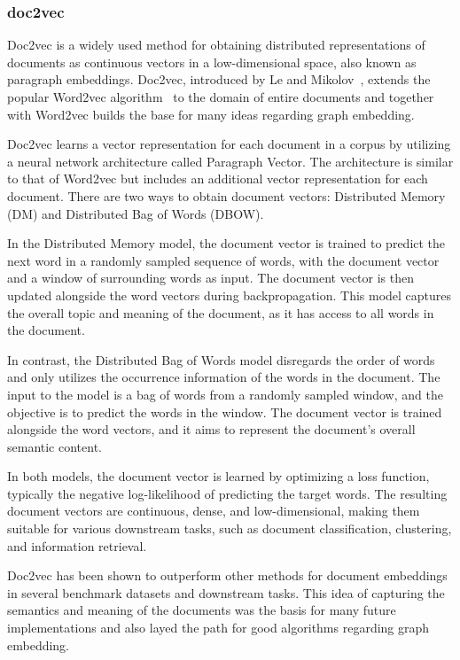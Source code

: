 \subsubsection{doc2vec}
Doc2vec is a widely used method for obtaining distributed representations of documents as continuous vectors in a low-dimensional space, also known as paragraph embeddings. Doc2vec, introduced by Le and Mikolov~\cite{2014doc2vec}, extends the popular Word2vec algorithm~\cite{mikolov2013distributed} to the domain of entire documents and together with Word2vec builds the base for many ideas regarding graph embedding.

Doc2vec learns a vector representation for each document in a corpus by utilizing a neural network architecture called Paragraph Vector. The architecture is similar to that of Word2vec but includes an additional vector representation for each document. There are two ways to obtain document vectors: Distributed Memory (DM) and Distributed Bag of Words (DBOW).

In the Distributed Memory model, the document vector is trained to predict the next word in a randomly sampled sequence of words, with the document vector and a window of surrounding words as input. The document vector is then updated alongside the word vectors during backpropagation. This model captures the overall topic and meaning of the document, as it has access to all words in the document.

In contrast, the Distributed Bag of Words model disregards the order of words and only utilizes the occurrence information of the words in the document. The input to the model is a bag of words from a randomly sampled window, and the objective is to predict the words in the window. The document vector is trained alongside the word vectors, and it aims to represent the document's overall semantic content.

In both models, the document vector is learned by optimizing a loss function, typically the negative log-likelihood of predicting the target words. The resulting document vectors are continuous, dense, and low-dimensional, making them suitable for various downstream tasks, such as document classification, clustering, and information retrieval.

Doc2vec has been shown to outperform other methods for document embeddings in several benchmark datasets and downstream tasks. This idea of capturing the semantics and meaning of the documents was the basis for many future implementations and also layed the path for good algorithms regarding graph embedding.

